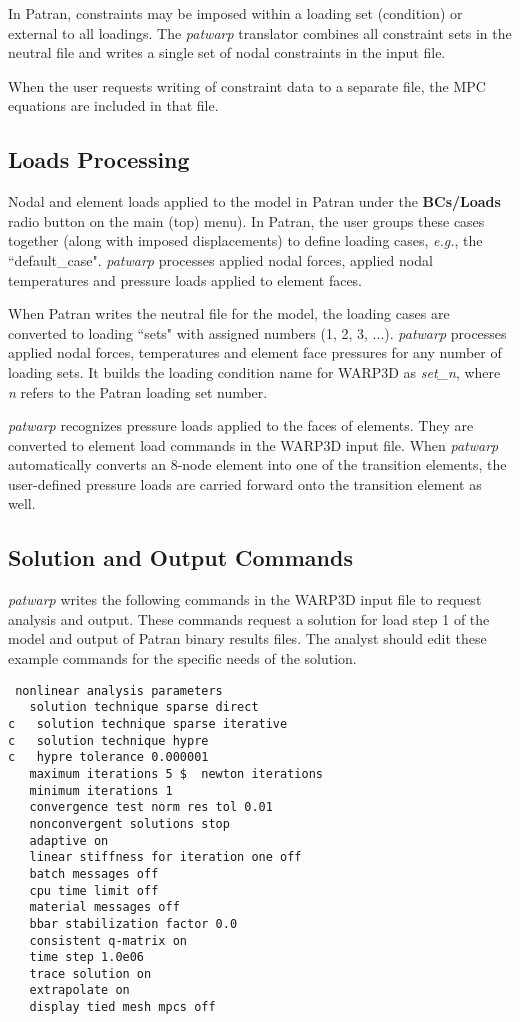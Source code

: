 \documentclass[11pt]{report}
\numberwithin{equation}{section}
\newcommand{\patwarp}{\textit{patwarp }}
\begin{document}
In Patran, constraints may be imposed within a loading set (condition) or
external to all loadings. The \textit{patwarp} translator combines all constraint sets in
the neutral file and writes a single set of nodal constraints in the input file.

When the user requests writing of constraint data to a separate file, the MPC
equations are included in that file.

\subsection{Loads Processing}
\noindent Nodal and element loads applied to the model in Patran under the \textbf{BCs/Loads} 
radio button on the main (top) menu). In Patran, the user groups these cases together
(along with imposed displacements) to define loading cases, \textit{e.g.}, the
``default\_case". \patwarp processes applied nodal forces, applied
nodal temperatures and pressure loads applied to element faces.

When Patran writes the neutral file for the model, the loading cases are
converted to loading ``sets" with assigned numbers (1, 2, 3, ...). \patwarp processes 
applied nodal forces, temperatures and element face
pressures for any number of loading sets.  It builds the loading
condition name for WARP3D as \textit{set\_n}, where \textit{n} refers to the Patran loading set
number. 

\patwarp recognizes pressure loads applied to the faces of
elements. They are converted to element load commands in the WARP3D input file.
When \textit{patwarp} automatically converts an 8-node element into one of the transition
elements, the user-defined pressure loads are carried forward onto the
transition element as well.

\subsection{Solution and Output Commands}
\noindent \textit{patwarp} writes the following commands in the WARP3D
input file to request analysis and output.
These commands request a solution for load step 1 of the model and output of
Patran binary results files. The analyst should edit these example
commands for the specific needs of the solution.
\small
\begin{verbatim}
 nonlinear analysis parameters
   solution technique sparse direct 
c   solution technique sparse iterative 
c   solution technique hypre
c   hypre tolerance 0.000001
   maximum iterations 5 $  newton iterations
   minimum iterations 1
   convergence test norm res tol 0.01
   nonconvergent solutions stop
   adaptive on
   linear stiffness for iteration one off
   batch messages off
   cpu time limit off
   material messages off
   bbar stabilization factor 0.0
   consistent q-matrix on
   time step 1.0e06
   trace solution on
   extrapolate on
   display tied mesh mpcs off
\end{verbatim}
\normalsize
\end{document}
